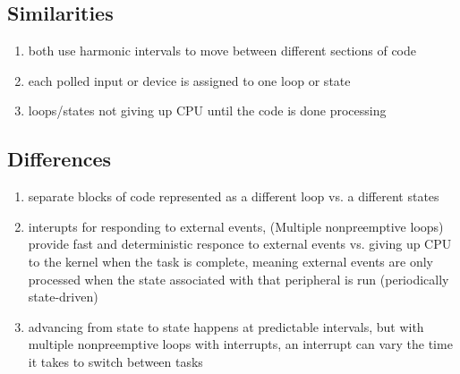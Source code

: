 \begin{comment}
  Multiple Nonpreemptive Loops with Interrupts (cont’d)
• Advantages:
– Guaranteed minimum polling frequency for each
input or device
– Guaranteed maximum response time for polled
inputs and devices
– External events are handled promptly and
deterministically using hardware-triggered interrupts.
• Disadvantages:
– Some devices may be polled faster than necessary,
which is wasteful of the processor’s time.
– The one software thread has less cohesion because
it now handles more than one loop. A state variable
keeps track of the timer ISR calls and the active loop.

\end{comment}


\subsection*{Similarities}
\begin{enumerate}
  \item both use harmonic intervals to move between different sections of code
  \item each polled input or device is assigned to one loop or state
  \item loops/states not giving up CPU until the code is done processing
\end{enumerate}

\subsection*{Differences}
\begin{enumerate}
  \item separate blocks of code represented as a different loop vs. a different
    states
  \item interupts for responding to external events, (Multiple nonpreemptive
    loops) provide fast and deterministic responce to external events vs. giving
    up CPU to the kernel when the task is complete, meaning external events are
    only processed when the state associated with that peripheral is run
    (periodically state-driven)
  \item advancing from state to state happens at predictable intervals, but with
    multiple nonpreemptive loops with interrupts, an interrupt can vary the time
    it takes to switch between tasks
\end{enumerate}
